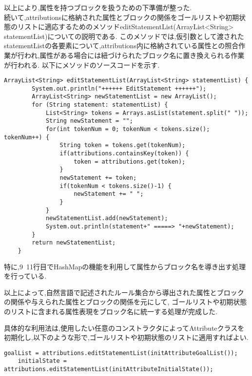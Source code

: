 \documentclass[uplatex,12pt]{jsarticle}
\begin{document}
以上により,属性を持つブロックを扱うための下準備が整った. \\

続いて,attributionsに格納された属性とブロックの関係をゴールリストや初期状態のリストに適応するためのメソッドeditStatementList(ArrayList<String> statementList)についての説明である.
このメソッドでは,仮引数として渡されたstatementListの各要素について,attributions内に格納されている属性との照合作業が行われ,属性がある場合には紐づけられたブロック名に置き換えられる作業が行われる.
以下にメソッドのソースコードを示す.
\begin{lstlisting}[caption=editStatementListメソッドの実装, label=mid]
    ArrayList<String> editStatementList(ArrayList<String> statementList) {
		System.out.println("++++++ EditStatement ++++++");
		ArrayList<String> newStatementList = new ArrayList();
		for (String statement: statementList) {
			List<String> tokens = Arrays.asList(statement.split(" "));
			String newStatement = "";
			for(int tokenNum = 0; tokenNum < tokens.size(); tokenNum++) {
				String token = tokens.get(tokenNum);
				if(attributions.containsKey(token)) {
					token = attributions.get(token);
				}
				newStatement += token;
				if(tokenNum < tokens.size()-1) {
					newStatement += " ";
				}
			}
			newStatementList.add(newStatement);
			System.out.println(statement+" =====> "+newStatement);
		}
		return newStatementList;
	}
\end{lstlisting}
特に,9~11行目でHashMapの機能を利用して属性からブロック名を導き出す処理を行っている.

以上によって,自然言語で記述されたルール集合から導出された属性とブロックの関係や与えられた属性とブロックの関係を元にして,
ゴールリストや初期状態のリストに含まれる属性表現をブロック名に統一する処理が完成した.

具体的な利用法は,使用したい任意のコンストラクタによってAttributeクラスを初期化し,以下のような形で,ゴールリストや初期状態のリストに適用すればよい.
\begin{lstlisting}[caption=editStatementListの利用, label=mid]
    goalList = attributions.editStatementList(initAttributeGoalList());
	initialState = attributions.editStatementList(initAttributeInitialState());
\end{lstlisting}
\end{document}
